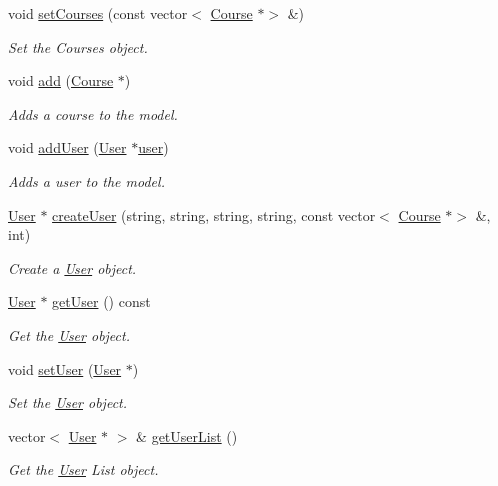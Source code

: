 \begin{DoxyCompactItemize}
void \hyperlink{classModelImpl_ae90d5e4e7ec786f3752a6551dab39d66}{set\+Courses} (const vector$<$ \hyperlink{classCourse}{Course} $\ast$$>$ \&)
\begin{DoxyCompactList}\small\item\em Set the Courses object. \end{DoxyCompactList}\item 
void \hyperlink{classModelImpl_a1847f819acc9bf909e31ec3438973225}{add} (\hyperlink{classCourse}{Course} $\ast$)
\begin{DoxyCompactList}\small\item\em Adds a course to the model. \end{DoxyCompactList}\item 
void \hyperlink{classModelImpl_aa0c7acd29ab42d13227e0e85fea044c8}{add\+User} (\hyperlink{classUser}{User} $\ast$\hyperlink{classModelImpl_a76f8d6f7634f9395c2576a5d11628e13}{user})
\begin{DoxyCompactList}\small\item\em Adds a user to the model. \end{DoxyCompactList}\item 
\hyperlink{classUser}{User} $\ast$ \hyperlink{classModelImpl_affad955ee2bdbfc58ac049632cd9668b}{create\+User} (string, string, string, string, const vector$<$ \hyperlink{classCourse}{Course} $\ast$$>$ \&, int)
\begin{DoxyCompactList}\small\item\em Create a \hyperlink{classUser}{User} object. \end{DoxyCompactList}\item 
\hyperlink{classUser}{User} $\ast$ \hyperlink{classModelImpl_ac098ad97916ff988d518ded5056dabb0}{get\+User} () const
\begin{DoxyCompactList}\small\item\em Get the \hyperlink{classUser}{User} object. \end{DoxyCompactList}\item 
void \hyperlink{classModelImpl_a9e1a1953a4d3355e147515c2a0b3c031}{set\+User} (\hyperlink{classUser}{User} $\ast$)
\begin{DoxyCompactList}\small\item\em Set the \hyperlink{classUser}{User} object. \end{DoxyCompactList}\item 
vector$<$ \hyperlink{classUser}{User} $\ast$ $>$ \& \hyperlink{classModelImpl_a46f441c1ba57cc395e6732cab80e78fd}{get\+User\+List} ()
\begin{DoxyCompactList}\small\item\em Get the \hyperlink{classUser}{User} List object. \end{DoxyCompactList}\item 

\end{DoxyCompactItemize}
